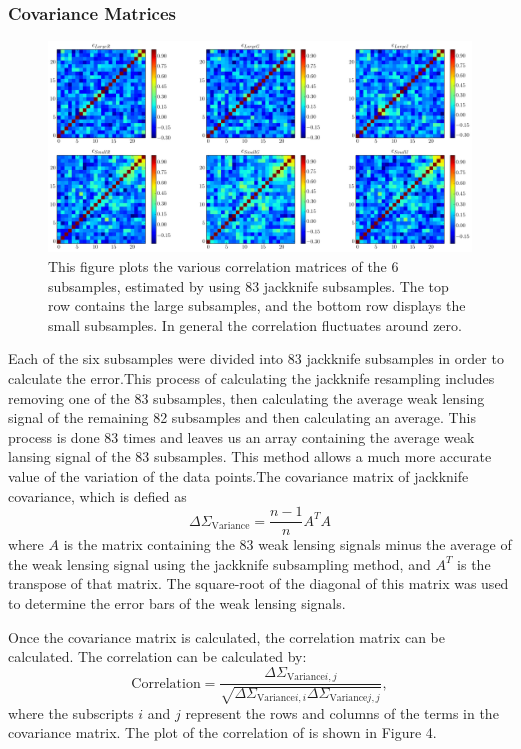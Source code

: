 \documentclass[iop]{emulateapj}
\begin{document}
\subsubsection{Covariance Matrices}\label{fig:Cov}
	\begin{figure}[ht]
		\includegraphics[width = \linewidth]{Correlation_Subsamples}
		\caption{This figure plots the various correlation matrices of the 6 subsamples, estimated by using 83 jackknife subsamples. The top row contains the large subsamples, and the bottom row displays the small subsamples. In general the correlation fluctuates around zero.}
	\end{figure}
Each of the six subsamples were divided into 83 jackknife subsamples in order to calculate the error.This process of calculating the jackknife resampling includes removing one of the 83 subsamples, then calculating the average weak lensing signal of the remaining 82 subsamples and then calculating an average. This process is done 83 times and leaves us an array containing the average weak lansing signal of the 83 subsamples. This method allows a much more accurate value of the variation of the data points.The covariance matrix of jackknife covariance, which is defied as
	\begin{equation}
		\Delta\Sigma_{\mathrm{Variance}} = \frac{n-1} {n} A^TA
	\end{equation}
where $A$ is the matrix containing the 83 weak lensing signals minus the average of the weak lensing signal using the jackknife subsampling method, and $A^T$ is the transpose of that matrix.  The square-root of the diagonal of this matrix was used to determine the error bars of the weak lensing signals.

Once the covariance matrix is calculated, the correlation matrix can be calculated. The correlation can be calculated by:
	\begin{equation}
		\mathrm{Correlation} = \frac{\Delta\Sigma_{\mathrm{Variance} i, j}} {\sqrt{{\Delta\Sigma_{\mathrm{Variance} i, i}  {\Delta\Sigma_{\mathrm{Variance} j, j}} }}},
	\end{equation}
where the subscripts $i$ and $j$ represent the rows and columns of the terms in the covariance matrix. The plot of the correlation of is shown in Figure 4.
\end{document}
